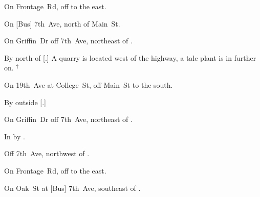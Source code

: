 

\begin{LocationList}

On Frontage~Rd, off   to the east.

On [Bus] 7th~Ave, north of  Main~St.

On Griffin~Dr off 7th~Ave, northeast of  .

By  north of [.]
A quarry is located west of the highway, a talc plant is in  further on.%
\textsuperscript{\scriptsize $\dagger$}

On 19th~Ave at College~St, off  Main~St to the south.

By  outside [.]

\Location{\TruckService \Service}
On Griffin~Dr off 7th~Ave, northeast of  .

\Location{\TruckStop \Gas \Rest}
In  by .

Off 7th~Ave, northwest of  .

On Frontage~Rd, off   to the east.

On Oak~St at [Bus] 7th~Ave, southeast of  .

\end{LocationList}
